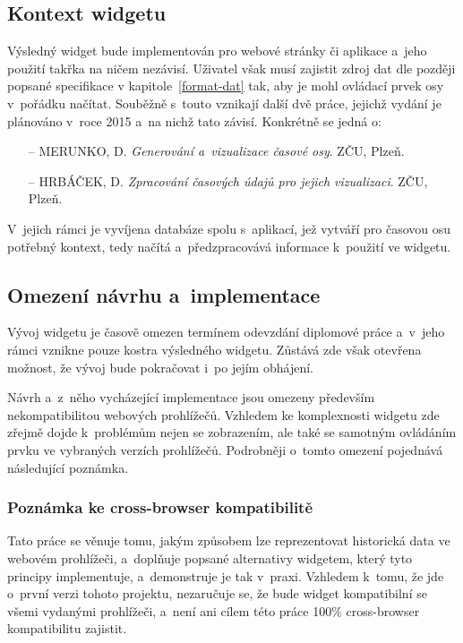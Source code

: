 		\subsection{Kontext widgetu}
		\label{kontext-widgetu}
			Výsledný widget bude implementován pro webové stránky či aplikace a~jeho použití takřka na ničem nezávisí. Uživatel však musí zajistit zdroj dat dle později popsané specifikace v kapitole~\ref{format-dat} tak, aby je mohl ovládací prvek osy v~pořádku načítat. Souběžně s~touto vznikají další dvě práce, jejichž vydání je plánováno v~roce 2015 a~na nichž tato závisí. Konkrétně se jedná o:
			\begin{itemize}
				\item[--] MERUNKO, D. \emph{Generování a~vizualizace časové osy}. ZČU, Plzeň.
				\item[--] HRBÁČEK, D. \emph{Zpracování časových údajů pro jejich vizualizaci}. ZČU, Plzeň.
			\end{itemize}
		 V~jejich rámci je vyvíjena databáze spolu s~aplikací, jež vytváří pro časovou osu potřebný kontext, tedy načítá a~předzpracovává informace k~použití ve widgetu.
			
		\subsection{Omezení návrhu a~implementace}
		\label{omezeni-navrhu}
			Vývoj widgetu je časově omezen termínem odevzdání diplomové práce a~v~jeho rámci vznikne pouze kostra výsledného widgetu. Zůstává zde však otevřena mož\-nost, že vývoj bude pokračovat i~po jejím obhájení.
			
			Návrh a~z~něho vycházející implementace jsou omezeny především nekompatibilitou webových prohlížečů. Vzhledem ke komplexnosti widgetu zde zřejmě dojde k~problémům nejen se zobrazením, ale také se samotným ovládáním prvku ve vybraných verzích prohlížečů. Podrobněji o~tomto omezení pojednává následující poznámka.

			\subsubsection*{Poznámka ke cross-browser kompatibilitě}
			\label{kompatibilita}
				Tato práce se věnuje tomu, jakým způsobem lze reprezentovat historická data ve webovém prohlížeči, a~doplňuje popsané alternativy widgetem, který tyto principy implementuje, a~demonstruje je tak v~praxi. Vzhledem k~tomu, že jde o~první verzi tohoto projektu, nezaručuje se, že bude widget kompatibilní se všemi vydanými prohlížeči, a~není ani cílem této práce 100\% cross-browser kompatibilitu zajistit.
				
